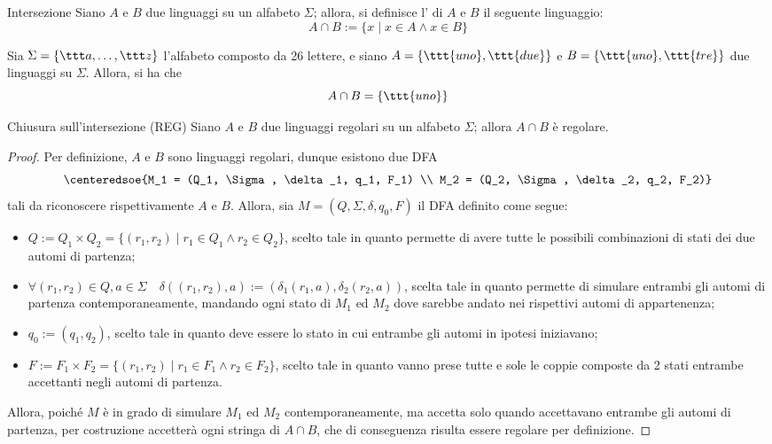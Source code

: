 \documentclass[a4paper, 12pt]{report}
\begin{document}
    \begin{frameddefn}{Intersezione}
        Siano $A$ e $B$ due linguaggi su un alfabeto $\Sigma$; allora, si definisce l' di $A$ e $B$ il seguente linguaggio: $$A \cap B := \{x \mid x \in A \land x \in B \}$$
    \end{frameddefn}

    \begin{example}[Intersezione]
        Sia $\Sigma = \{\ttt a , \ldots, \ttt z\}$ l'alfabeto composto da 26 lettere, e siano $A = \{\ttt{uno}, \ttt{due}\}$ e $B = \{\ttt{uno}, \ttt{tre}\}$ due linguaggi su $\Sigma$. Allora, si ha che $$A \cap B = \{\ttt{uno}\}$$
    \end{example}

    \begin{framedprop}{Chiusura sull'intersezione (REG)}
        Siano $A$ e $B$ due linguaggi regolari su un alfabeto $\Sigma$; allora $A \cap B$ è regolare.
    \end{framedprop}

    \begin{proof}
        Per definizione, $A$ e $B$ sono linguaggi regolari, dunque esistono due DFA $$\centeredsoe{M_1 = (Q_1, \Sigma, \delta_1, q_1, F_1) \\ M_2 = (Q_2, \Sigma, \delta_2, q_2, F_2)}$$ tali da riconoscere rispettivamente $A$ e $B$. Allora, sia $M = (Q, \Sigma, \delta, q_0, F)$ il DFA definito come segue:

        \begin{itemize}
            \item $Q := Q_1 \times Q_2 = \{(r_1, r_2) \mid r_1 \in Q_1 \land r_2 \in Q_2\}$, scelto tale in quanto permette di avere tutte le possibili combinazioni di stati dei due automi di partenza;
            \item $\forall (r_1, r_2) \in Q, a \in \Sigma \quad \delta((r_1, r_2), a) := (\delta_1(r_1, a), \delta_2(r_2, a))$, scelta tale in quanto permette di simulare entrambi gli automi di partenza contemporaneamente, mandando ogni stato di $M_1$ ed $M_2$ dove sarebbe andato nei rispettivi automi di appartenenza;
            \item $q_0 := (q_1, q_2)$, scelto tale in quanto deve essere lo stato in cui entrambe gli automi in ipotesi iniziavano;
            \item $F:= F_1 \times F_2 = \{(r_1, r_2) \mid r_1 \in F_1 \land r_2 \in F_2\}$, scelto tale in quanto vanno prese tutte e sole le coppie composte da 2 stati entrambe accettanti negli automi di partenza.
        \end{itemize}

        Allora, poiché $M$ è in grado di simulare $M_1$ ed $M_2$ contemporaneamente, ma accetta solo quando accettavano entrambe gli automi di partenza, per costruzione accetterà ogni stringa di $A \cap B$, che di conseguenza risulta essere regolare per definizione.
    \end{proof}
\end{document}

